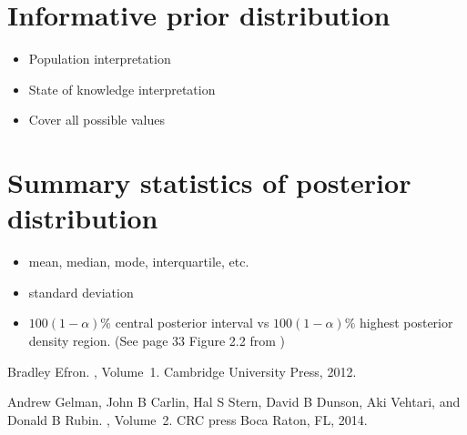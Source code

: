 \documentclass[twoside]{article}
\begin{document}
\section{Informative prior distribution}
\begin{itemize}
    \item Population interpretation
    \item State of knowledge interpretation
    \item Cover all possible values
\end{itemize}

\section{Summary statistics of posterior distribution}

\begin{itemize}
    \item mean, median, mode, interquartile, etc.
        \item standard deviation
            \item $100(1 - \alpha)\%$ central posterior interval vs $100(1 -
                \alpha)\%$ highest posterior density region. (See page 33 Figure
                2.2 from \cite{gelman2014bayesian})
            
\end{itemize}




\begin{thebibliography}{}

Bradley Efron.
, Volume~1.
\newblock Cambridge University Press, 2012.


Andrew Gelman, John B Carlin, Hal S Stern, David B Dunson, Aki Vehtari, and Donald B Rubin.
, Volume~2.
\newblock CRC press Boca Raton, FL, 2014.

\end{thebibliography}
\end{document}
